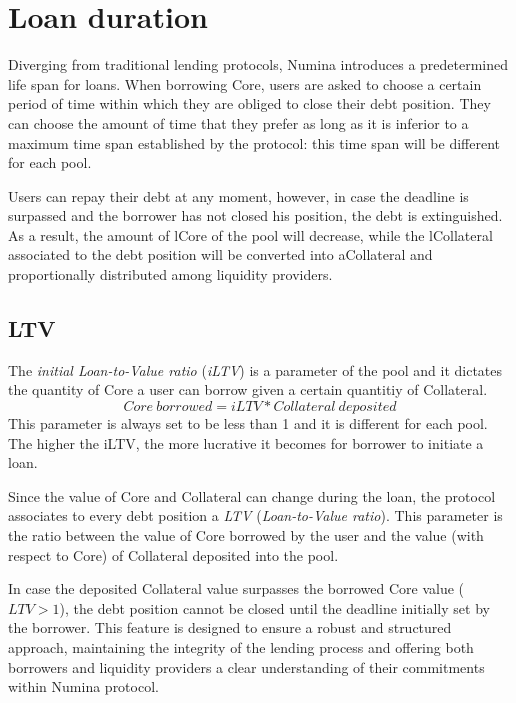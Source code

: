 \documentclass[12pt]{paper}
\begin{document}
\section{Loan duration}
\label{sec:duration}
	Diverging from traditional lending protocols, Numina introduces a predetermined life span for loans. When borrowing Core, users are asked to choose a certain period of time within which they are obliged to close their debt position. They can choose the amount of time that they prefer as long as it is inferior to a maximum time span established by the protocol: this time span will be different for each pool.
	\par Users can repay their debt at any moment, however, in case the deadline is surpassed and the borrower has not closed his position, the debt is extinguished. As a result, the amount of lCore of the pool will decrease, while the lCollateral associated to the debt position will be converted into aCollateral and proportionally distributed among liquidity providers.
	
	\subsection{LTV}
	\label{subsec:ltv}
		The \textit{initial Loan-to-Value ratio} (\textit{iLTV}) is a parameter of the pool and it dictates the quantity of Core a user can borrow given a certain quantitiy of Collateral.
		\begin{equation}
			Core\ borrowed = iLTV * Collateral\ deposited
		\end{equation}
		This parameter is always set to be less than 1 and it is different for each pool. The higher the iLTV, the more lucrative  it becomes for borrower to initiate a loan.
		\par Since the value of Core and Collateral can change during the loan, the protocol associates to every debt position a \textit{LTV} (\textit{Loan-to-Value ratio}). This parameter is the ratio between the value of Core borrowed by the user and the value (with respect to Core) of Collateral deposited into the pool.
		\par In case the deposited Collateral value surpasses the borrowed Core value ($LTV>1$), the debt position cannot be closed until the deadline initially set by the borrower. This feature is designed to ensure a robust and structured approach, maintaining the integrity of the lending process and offering both borrowers and liquidity providers a clear understanding of their commitments within Numina protocol.
		
\end{document}
